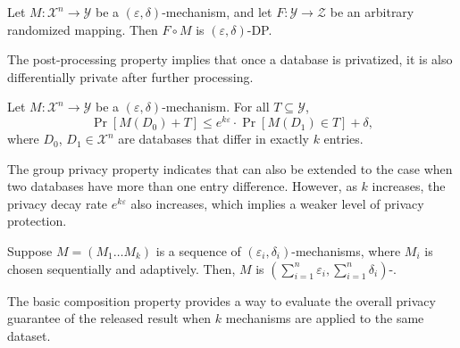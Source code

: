 \begin{prop} Let $M:\mathcal{X}^{n} \rightarrow \mathcal{Y}$ be a $\left(\varepsilon,\delta \right)  $-\differentialprivacy mechanism, and let $F:\mathcal{Y}\rightarrow \mathcal{Z}$ be an arbitrary randomized mapping. Then $F\circ M$ is $\left(\varepsilon,\delta\right)  $-DP.
    \label{prop:Post-Processing}
\end{prop}
The post-processing property implies that once a database is privatized, it is also differentially private after further processing.

\begin{prop} Let $M:\mathcal{X}^{n} \rightarrow \mathcal{Y}$ be a $\left( \varepsilon ,\delta \right)$-\differentialprivacy mechanism. For all $T\subseteq \mathcal{Y}$,
    \[\Pr \left[ M\left(D_{0}\right) +T\right] \leq e^{k \varepsilon}\cdot \Pr \left[ M\left( D_{1}\right) \in T\right] +\delta, \]
    where $D_{0}$, $D_{1}\in \mathcal{X}^{n}$ are databases that differ in exactly $k$ entries.
\end{prop}

The group privacy property indicates that \differentialprivacy can also be extended to the case when two databases have more than one entry difference. However, as $k$ increases, the privacy decay rate $e^{k\varepsilon}$ also increases, which implies a weaker level of privacy protection.

\begin{prop}
    Suppose $M=\left( M_{1}\ldots M_{k}\right)$  is a sequence of $\left( \varepsilon_{i} ,\delta_{i} \right)$-\differentialprivacy mechanisms, where $M_{i}$ is chosen sequentially and adaptively. Then, $M$ is $\left(\sum_{i=1}^n\varepsilon_{i} ,\sum_{i=1}^n\delta_{i} \right)$-\differentialprivacy.
\end{prop}

The basic composition property provides a way to evaluate the overall privacy guarantee of the released result when $k$ \differentialprivacy mechanisms are applied to the same dataset.

